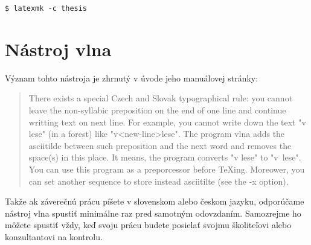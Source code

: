 \begin{verbatim}
$ latexmk -c thesis
\end{verbatim}


\section{Nástroj vlna}

Význam tohto nástroja je zhrnutý v úvode jeho manuálovej stránky:

\begin{quote}
There exists a special Czech and Slovak typographical rule: you cannot leave the non-syllabic preposition on the end of one line and continue writting text on next line. For  example, you  cannot  write  down  the text "v lese" (in a forest) like "v<new-line>lese". The program vlna adds the asciitilde between  such  preposition  and  the next  word and removes the space(s) in this place.  It means, the program converts "v lese" to "v~lese". You  can  use  this  program  as  a  preporcessor  before  TeXing. Moreower,  you  can  set  another  sequence  to  store instead asciitilte (see the -x option).
\end{quote}

Takže ak záverečnú prácu píšete v slovenskom alebo českom jazyku, odporúčame nástroj vlna spustiť minimálne raz pred samotným odovzdaním. Samozrejme ho môžete spustiť vždy, keď svoju prácu budete posielať svojmu školiteľovi alebo konzultantovi na kontrolu.
